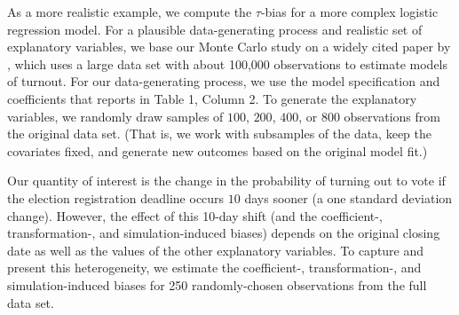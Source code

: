 \documentclass[11pt]{article}
\begin{document}
As a more realistic example, we compute the $\tau$-bias for a more complex logistic regression model. For a plausible data-generating process and realistic set of explanatory variables, we base our Monte Carlo study on a widely cited paper by \cite{BerryDeMerittEsarey2010}, which uses a large data set with about 100,000 observations to estimate models of turnout. For our data-generating process, we use the model specification and coefficients that \cite{BerryDeMerittEsarey2010} reports in Table 1, Column 2. To generate the explanatory variables, we randomly draw samples of $100$, $200$, $400$, or $800$ observations from the original data set. (That is, we work with subsamples of the \cite{BerryDeMerittEsarey2010} data, keep the covariates fixed, and generate new outcomes based on the original model fit.)



Our quantity of interest is the change in the probability of turning out to vote if the election registration deadline occurs $10$ days sooner (a one standard deviation change). However, the effect of this 10-day shift (and the coefficient-, transformation-, and simulation-induced biases) depends on the original closing date as well as the values of the other explanatory variables. To capture and present this heterogeneity, we estimate the coefficient-, transformation-, and simulation-induced biases for 250 randomly-chosen observations from the full data set.

\end{document}
